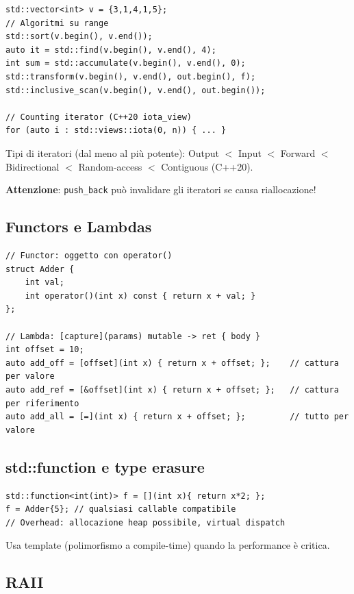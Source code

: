 \documentclass[11pt,a4paper]{article}
\theoremstyle{remark}
\begin{document}
\begin{lstlisting}
std::vector<int> v = {3,1,4,1,5};
// Algoritmi su range
std::sort(v.begin(), v.end());
auto it = std::find(v.begin(), v.end(), 4);
int sum = std::accumulate(v.begin(), v.end(), 0);
std::transform(v.begin(), v.end(), out.begin(), f);
std::inclusive_scan(v.begin(), v.end(), out.begin());

// Counting iterator (C++20 iota_view)
for (auto i : std::views::iota(0, n)) { ... }
\end{lstlisting}

Tipi di iteratori (dal meno al più potente): Output $<$ Input $<$ Forward $<$ Bidirectional $<$ Random-access $<$ Contiguous (C++20).

\textbf{Attenzione}: \texttt{push\_back} può invalidare gli iteratori se causa riallocazione!

\subsection{Functors e Lambdas}

\begin{lstlisting}
// Functor: oggetto con operator()
struct Adder {
    int val;
    int operator()(int x) const { return x + val; }
};

// Lambda: [capture](params) mutable -> ret { body }
int offset = 10;
auto add_off = [offset](int x) { return x + offset; };    // cattura per valore
auto add_ref = [&offset](int x) { return x + offset; };   // cattura per riferimento
auto add_all = [=](int x) { return x + offset; };         // tutto per valore
\end{lstlisting}

\subsection{std::function e type erasure}

\begin{lstlisting}
std::function<int(int)> f = [](int x){ return x*2; };
f = Adder{5}; // qualsiasi callable compatibile
// Overhead: allocazione heap possibile, virtual dispatch
\end{lstlisting}

Usa template (polimorfismo a compile-time) quando la performance è critica.

\subsection{RAII}
\end{document}
